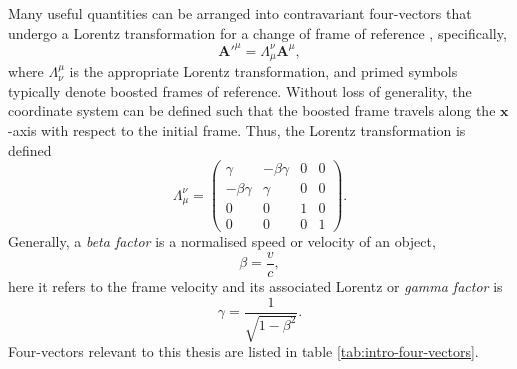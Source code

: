 Many useful quantities can be arranged into contravariant four-vectors that undergo a Lorentz transformation for a change of frame of reference \cite{steaneRelativityMadeRelatively2012}, specifically, 
\begin{equation}
	\mathbf{A}'^\mu =\Lambda_\mu^\nu \mathbf{A}^\mu,
\end{equation}
where $\Lambda^\mu_\nu$ is the appropriate Lorentz transformation, and primed symbols typically denote boosted frames of reference. Without loss of generality, the coordinate system can be defined such that the boosted frame travels along the $\mathbf{x}$-axis with respect to the initial frame. Thus, the Lorentz transformation is defined
\begin{equation}\label{eq:zvp_lorentz}
	\Lambda_\mu^\nu = \begin{pmatrix}
		\gamma & -\beta\gamma & 0 & 0\\
		-\beta\gamma & \gamma & 0 & 0\\
		0 & 0& 1 & 0\\
		0 & 0 & 0 & 1
	\end{pmatrix}.
\end{equation}
Generally, a \textit{beta factor} is a normalised speed or velocity of an object,
\begin{equation}
	\beta = \frac{v}{c}, 
\end{equation}
here it refers to the frame velocity and its associated Lorentz or \textit{gamma factor} is
\begin{equation}
	\gamma = \frac{1}{\sqrt{1-\beta^2}}.
\end{equation}
Four-vectors relevant to this thesis are listed in table \ref{tab:intro-four-vectors}.

